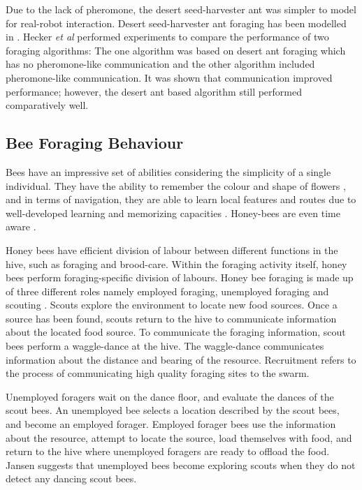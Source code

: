 Due to the lack of pheromone, the desert seed-harvester ant was simpler to model for real-robot interaction. Desert seed-harvester ant foraging has been modelled in \cite{moller1998modeling,hecker2012formica}. Hecker \textit{et al} \cite{hecker2012formica} performed experiments to compare the performance of two foraging algorithms: The one algorithm was based on desert ant foraging which has no pheromone-like communication and the other algorithm included pheromone-like communication. It was shown that communication improved performance; however, the desert ant based algorithm still performed comparatively well. 

\subsection{Bee Foraging Behaviour}
\label{bees:biologicalinspiration}
Bees have an impressive set of abilities considering the simplicity of a single individual. They have the ability to remember the colour and shape of flowers \cite{zhang2006honeybee}, and in terms of navigation, they are able to learn local features and routes due to well-developed learning and memorizing capacities \cite{menzel2001cognitive}. Honey-bees are even time aware \cite{moore1989influence}. 

Honey bees have efficient division of labour between different functions in the hive, such as foraging and brood-care. Within the foraging activity itself, honey bees perform foraging-specific division of labours. Honey bee foraging is made up of three different roles namely employed foraging, unemployed foraging and scouting \cite{seeley2009wisdom}. Scouts explore the environment to locate new food sources. Once a source has been found, scouts return to the hive to communicate information about the located food source. To communicate the foraging information, scout bees perform a waggle-dance at the hive. The waggle-dance communicates information about the distance and bearing of the resource. Recruitment \cite{seeley2009wisdom} refers to the process of communicating high quality foraging sites to the swarm.

Unemployed foragers wait on the dance floor, and evaluate the dances of the scout bees. An unemployed bee selects a location described by the scout bees, and become an employed forager. Employed forager bees use the information about the resource, attempt to locate the source, load themselves with food, and return to the hive where unemployed foragers are ready to offload the food. Jansen \cite{janson2007searching} suggests that unemployed bees become exploring scouts when they do not detect any dancing scout bees. 


